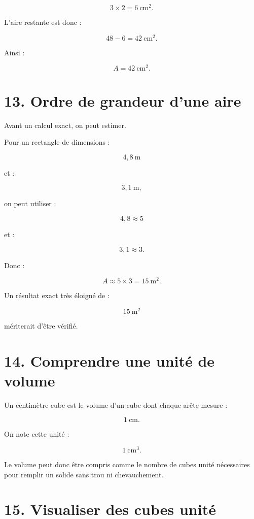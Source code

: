 \[
3\times2=6\ \text{cm}^2.
\]

L’aire restante est donc :

\[
48-6=42\ \text{cm}^2.
\]

Ainsi :

\[
\boxed{A=42\ \text{cm}^2}.
\]

\section{13. Ordre de grandeur d’une aire}

Avant un calcul exact, on peut estimer.

Pour un rectangle de dimensions :

\[
4{,}8\ \text{m}
\]

et :

\[
3{,}1\ \text{m},
\]

on peut utiliser :

\[
4{,}8\approx5
\]

et :

\[
3{,}1\approx3.
\]

Donc :

\[
A\approx5\times3=15\ \text{m}^2.
\]

Un résultat exact très éloigné de :

\[
15\ \text{m}^2
\]

mériterait d’être vérifié.

\section{14. Comprendre une unité de volume}

Un centimètre cube est le volume d’un cube dont chaque arête mesure :

\[
1\ \text{cm}.
\]

On note cette unité :

\[
1\ \text{cm}^3.
\]

Le volume peut donc être compris comme le nombre de cubes unité nécessaires pour remplir un solide sans trou ni chevauchement.

\section{15. Visualiser des cubes unité}


